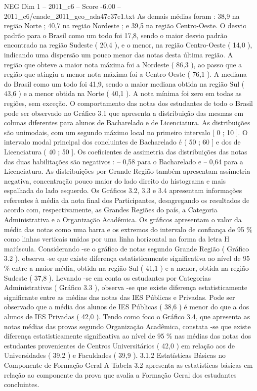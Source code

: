 \begin{textsample}{NEG Dim 1 – 2011\_c6 – Score -6.00 – 2011\_c6/enade\_2011\_geo\_ada47c37e1.txt}
As demais médias foram : 38,9 na região Norte ; 40,7 na região Nordeste ; e 39,5 na região Centro-Oeste.
O desvio padrão para o Brasil como um todo foi 17,8, sendo o maior desvio padrão encontrado na região Sudeste ( 20,4 ), e o menor, na região Centro-Oeste ( 14,0 ), indicando uma dispersão um pouco menor das notas desta última região.
A região que obteve a maior nota máxima foi a Nordeste ( 86,3 ), ao passo que a região que atingiu a menor nota máxima foi a Centro-Oeste ( 76,1 ).
A mediana do Brasil como um todo foi 41,9, sendo a maior mediana obtida na região Sul ( 43,6 ) e a menor obtida na Norte ( 40,1 ).
A nota mínima foi zero em todas as regiões, sem exceção.
O comportamento das notas dos estudantes de todo o Brasil pode ser observado no Gráfico 3.1 que apresenta a distribuição das mesmas em colunas diferentes para alunos de Bacharelado e de Licenciatura.
As distribuições são unimodais, com um segundo máximo local no primeiro intervalo [ 0 ; 10 ].
O intervalo modal principal dos concluintes de Bacharelado é ( 50 ; 60 ] e dos de Licenciatura ( 40 ; 50 ].
Os coeficientes de assimetria das distribuições das notas das duas habilitações são negativos : – 0,58 para o Bacharelado e – 0,64 para a Licenciatura.
As distribuições por Grande Região também apresentam assimetria negativa, concentração pouco maior do lado direito do histograma e mais espalhada do lado esquerdo.
Os Gráficos 3.2, 3.3 e 3.4 apresentam informações referentes à média da nota final dos Participantes, desagregando os resultados de acordo com, respectivamente, as Grandes Regiões do país, a Categoria Administrativa e a Organização Acadêmica.
Os gráficos apresentam o valor da média das notas como uma barra e os extremos do intervalo de confiança de 95 \% como linhas verticais unidas por uma linha horizontal na forma da letra H maiúscula.
Considerando -se o gráfico de notas segundo Grande Região ( Gráfico 3.2 ), observa -se que existe diferença estatisticamente significativa ao nível de 95 \% entre a maior média, obtida na região Sul ( 41,1 ) e a menor, obtida na região Sudeste ( 37,8 ).
Levando -se em conta os estudantes por Categorias Administrativas ( Gráfico 3.3 ), observa -se que existe diferença estatisticamente significante entre as médias das notas das IES Públicas e Privadas.
Pode ser observado que a média dos alunos de IES Públicas ( 38,6 ) é menor do que a dos alunos de IES Privadas ( 42,0 ).
Tendo como foco o Gráfico 3.4, que apresenta as notas médias das provas segundo Organização Acadêmica, constata -se que existe diferença estatisticamente significativa ao nível de 95 \% nas médias das notas dos estudantes provenientes de Centros Universitários ( 42,0 ) em relação aos de Universidades ( 39,2 ) e Faculdades ( 39,9 ). 3.1.2 Estatísticas Básicas no Componente de Formação Geral A Tabela 3.2 apresenta as estatísticas básicas em relação ao componente da prova que avalia a Formação Geral dos estudantes concluintes.

\end{textsample}
